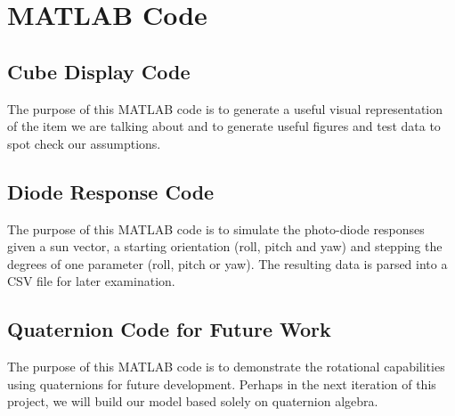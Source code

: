 \documentclass[10pt, letterpaper]{article}
\newcommand\docstretch{1.2}
\begin{document}
\newpage
\section{MATLAB Code}

\subsection{Cube Display Code}

The purpose of this MATLAB code is to generate a useful visual representation of the item we are talking about and to generate useful figures and test data to spot check our assumptions.


\setstretch{\docstretch}
\newpage

\subsection{Diode Response Code}

The purpose of this MATLAB code is to simulate the photo-diode responses given a sun vector, a starting orientation (roll, pitch and yaw) and stepping the degrees of one parameter (roll, pitch or yaw). The resulting data is parsed into a CSV file for later examination.


\setstretch{\docstretch}
\newpage


\subsection{Quaternion Code for Future Work}

The purpose of this MATLAB code is to demonstrate the rotational capabilities using quaternions for future development. Perhaps in the next iteration of this project, we will build our model based solely on quaternion algebra.


\setstretch{\docstretch}
\newpage
\end{document}
